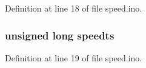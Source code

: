 Definition at line 18 of file speed.\+ino.

\subsubsection[{\texorpdfstring{speedts}{speedts}}]{\setlength{\rightskip}{0pt plus 5cm}unsigned long speedts}\hypertarget{group__speed_ga605bafc427aaa8e9718a112441ba88a7}{}\label{group__speed_ga605bafc427aaa8e9718a112441ba88a7}


Definition at line 19 of file speed.\+ino.

